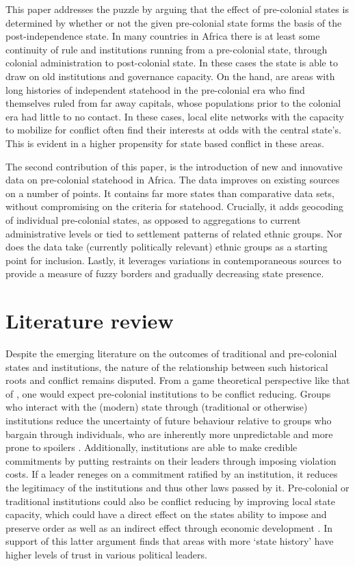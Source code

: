 \documentclass[12pt]{article}
\begin{document}
This paper addresses the puzzle by arguing that the effect of pre-colonial
states is determined by whether or not the given pre-colonial state forms the
basis of the post-independence state. In many countries in Africa there is at
least some continuity of rule and institutions running from a pre-colonial
state, through colonial administration to post-colonial state. In these cases
the state is able to draw on old institutions and governance capacity. On the
hand, are areas with long histories of independent statehood in the pre-colonial
era who find themselves ruled from far away capitals, whose populations prior to
the colonial era had little to no contact. In these cases, local elite networks
with the capacity to mobilize for conflict often find their interests at odds
with the central state's. This is evident in a higher propensity for state based
conflict in these areas.

The second contribution of this paper, is the introduction of new and innovative
data on pre-colonial statehood in Africa. The data improves on existing sources on
a number of points. It contains far more states than comparative data sets,
without compromising on the criteria for statehood. Crucially, it adds geocoding
of individual pre-colonial states, as opposed to aggregations to current
administrative levels or tied to settlement patterns of related ethnic groups.
Nor does the data take (currently politically relevant) ethnic groups as
a starting point for inclusion. %
Lastly, it leverages variations in contemporaneous sources to provide a measure
of fuzzy borders and gradually decreasing state presence.

\section{Literature review} 

Despite the emerging literature on the outcomes of traditional and pre-colonial
states and institutions, the nature of the relationship between such historical
roots and conflict remains disputed. From a game theoretical perspective like
that of \citet{Fearon1995}, one would expect pre-colonial institutions to be
conflict reducing. Groups who interact with the (modern) state through
(traditional or otherwise) institutions reduce the uncertainty of future
behaviour relative to groups who bargain through individuals, who are inherently
more unpredictable and more prone to spoilers \citep{Wig2016}. Additionally,
institutions are able to make credible commitments by putting restraints on
their leaders through imposing violation costs. If a leader reneges on a
commitment ratified by an institution, it reduces the legitimacy of the
institutions and thus other laws passed by it. Pre-colonial or traditional
institutions could also be conflict reducing by improving local state capacity,
which could have a direct effect on the states ability to impose and preserve
order as well as an indirect effect through economic development
\citep{Depetris-Chauvin2016}. In support of this latter argument
\citet{Depetris-Chauvin2016} finds that areas with more `state history' have
higher levels of trust in various political leaders.
\end{document}
